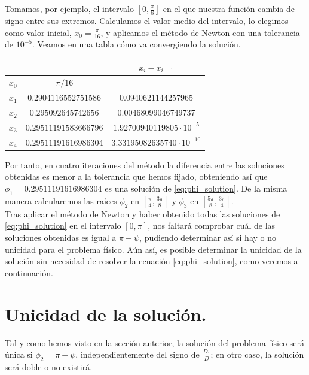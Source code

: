 Tomamos, por ejemplo, el intervalo $[0,\frac{\pi}{8}]$ en el que nuestra función cambia de signo entre sus extremos. Calculamos el valor medio del intervalo, lo elegimos como valor inicial, $x_0=\frac{\pi}{16}$, y aplicamos el método de Newton con una tolerancia de $10^{-5}$. Veamos en una tabla cómo va convergiendo la solución.
\begin{table}[H]
\centering
\def\arraystretch{1.5}
\setlength{\tabcolsep}{20pt}
\begin{tabular}{cc|c}
      &                       & $x_i-x_{i-1}$                   \\ \hline
$x_0$ & $\pi/16$              &                                 \\ \hline
$x_1$ & $0.2904116552751586$  & $0.0940621144257965$            \\ \hline
$x_2$ & $0.295092645742656$   & $0.00468099046749737$           \\ \hline
$x_3$ & $0.29511191583666796$ & $1.92700940119805\cdot10^{-5}$  \\ \hline
$x_4$ & $0.29511191616986304$ & $3.33195082635740\cdot10^{-10}$ \\ \hline
\end{tabular}
\end{table}

Por tanto, en cuatro iteraciones del método la diferencia entre las soluciones obtenidas es menor a la tolerancia que hemos fijado, obteniendo así que $\phi_1=0.29511191616986304$ es una solución de \eqref{eq:phi_solution}. De la misma manera calcularemos las raíces $\phi_2$ en $[\frac{\pi}{4},\frac{3\pi}{8}]$ y $\phi_3$ en $[\frac{5\pi}{8},\frac{3\pi}{4}]$.\\

Tras aplicar el método de Newton y haber obtenido todas las soluciones de \eqref{eq:phi_solution} en el intervalo $[0,\pi]$, nos faltará comprobar cuál de las soluciones obtenidas es igual a $\pi-\psi$, pudiendo determinar así si hay o no unicidad para el problema físico. Aún así, es posible determinar la unicidad de la solución sin necesidad de resolver la ecuación \eqref{eq:phi_solution}, como veremos a continuación.\\

\section{Unicidad de la solución.}
\label{sec:unicidad}
Tal y como hemos visto en la sección anterior, la solución del problema físico será única si $\phi_2=\pi-\psi$, independientemente del signo de $\frac{D_1}{D}$; en otro caso, la solución será doble o no existirá.\\

